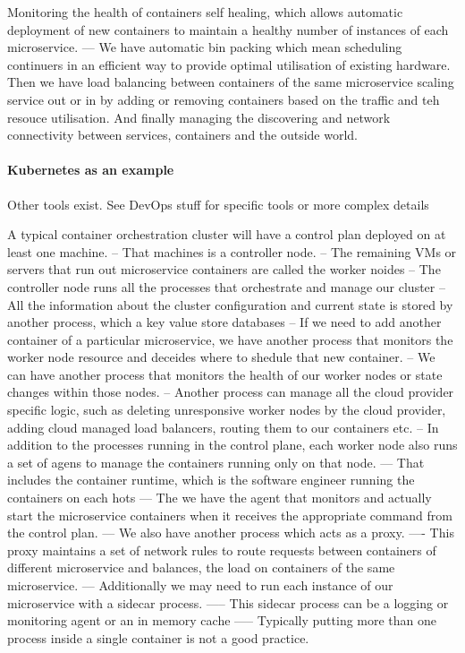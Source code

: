 \documentclass[a4paper, 11pt]{book}
\begin{document}
{    Monitoring the health of containers self healing, which allows automatic deployment of new containers to maintain a healthy number of instances of each microservice.
    --- We have automatic bin packing which mean scheduling continuers in an efficient way to provide optimal utilisation of existing hardware.
    Then we have load balancing between containers of the same microservice scaling service out or in by adding or removing containers based on the traffic and teh resouce utilisation.
    And finally managing the discovering and network connectivity between services, containers and the outside world.

    \paragraph{Kubernetes as an example}
    Other tools exist. See DevOps stuff for specific tools or more complex details

    A typical container orchestration cluster will have a control plan deployed on at least one machine.
    -- That machines is a controller node.
    -- The remaining VMs or servers that run out microservice containers are called the worker noides
    -- The controller node runs all the processes that orchestrate and manage our cluster
    -- All the information about the cluster configuration and current state is stored by another process, which a key value store databases
    -- If we need to add another container of a particular microservice, we have another process that monitors the worker node resource and deceides where to shedule that new container.
    -- We can have another process that monitors the health of our worker nodes or state changes within those nodes.
    -- Another process can manage all the cloud provider specific logic, such as deleting unresponsive worker nodes by the cloud provider, adding cloud managed load balancers, routing them to our containers etc.
    -- In addition to the processes running in the control plane, each worker node also runs a set of agens to manage the containers running only on that node.
    --- That includes the container runtime, which is the software engineer running the containers on each hots
    --- The we have the agent that monitors and actually start the microservice containers when it receives the appropriate command from the control plan.
    --- We also have another process which acts as a proxy.
    ---- This proxy maintains a set of network rules to route requests between containers of different microservice and balances, the load on containers of the same microservice.
    --- Additionally we may need to run each instance of our microservice with a sidecar process.
    ----- This sidecar process can be a logging or monitoring agent or an in memory cache
    ----- Typically putting more than one process inside a single container is not a good practice.

}
\end{document}
